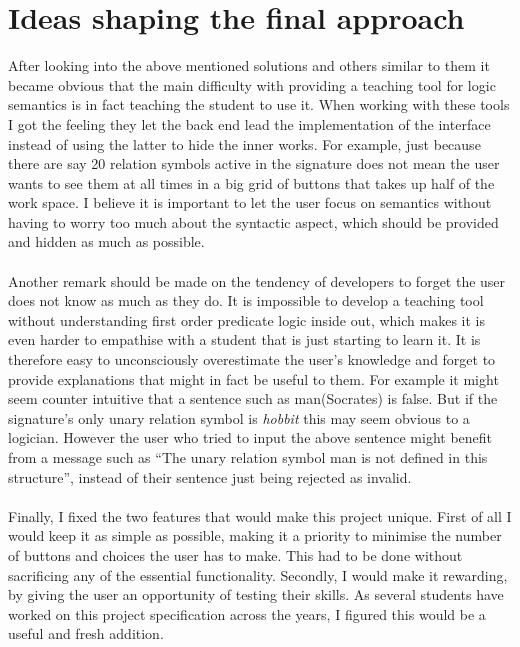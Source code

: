 \documentclass{report}
\begin{document}
\section{Ideas shaping the final approach}
After looking into the above mentioned solutions and others similar to them it 
became obvious that the main difficulty with providing a teaching tool for logic 
semantics is in fact teaching the student to use it. When working with these 
tools I got the feeling they let the back end lead the implementation of the 
interface instead of using the latter to hide the inner works. For example, just 
because there are say 20 relation symbols active in the signature does not mean 
the user wants to see them at all times in a big grid of buttons that takes up 
half of the work space. I believe it is important to let the user focus on 
semantics without having to worry too much about the syntactic aspect, which 
should be provided and hidden as much as possible. 
\\ \\
Another remark should be made on the tendency of developers to forget the user 
does not know as much as they do. It is impossible to develop a teaching tool 
without understanding first order predicate logic inside out, which makes it is 
even harder to empathise with a student that is just starting to learn it. It is 
therefore easy to unconsciously overestimate the user's knowledge and forget to 
provide explanations that might in fact be useful to them. For example it might 
seem counter intuitive that a sentence such as man(Socrates) is false. But if 
the signature's only unary relation symbol is \emph{hobbit} this may seem 
obvious to a logician. However the user who tried to input the above sentence 
might benefit from a message such as ``The unary relation symbol man is not 
defined in this structure'', instead of their sentence just being rejected as 
invalid. 
\\ \\
Finally, I fixed the two features that would make this project unique. First of 
all I would keep it as simple as possible, making it a priority to minimise the 
number of buttons and choices the user has to make. This had to be done without 
sacrificing any of the essential functionality. Secondly, I would make it 
rewarding, by giving the user an opportunity of testing their skills. As several 
students have worked on this project specification across the years, I figured 
this would be a useful and fresh addition.
\end{document}
